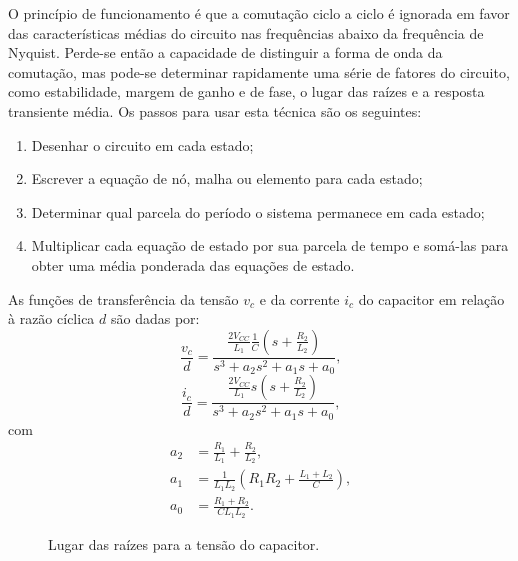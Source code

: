   O princípio de funcionamento é que a comutação ciclo a ciclo é ignorada em favor das características médias do circuito nas frequências abaixo da frequência de Nyquist. Perde-se então a capacidade de distinguir a forma de onda da comutação, mas pode-se determinar rapidamente uma série de fatores do circuito, como estabilidade, margem de ganho e de fase, o lugar das raízes e a resposta transiente média. Os passos para usar esta técnica são
  os seguintes:

  \begin{enumerate}
    \item Desenhar o circuito em cada estado;
    \item Escrever a equação de nó, malha ou elemento para cada estado;
    \item Determinar qual parcela do período o sistema permanece em cada estado;
    \item Multiplicar cada equação de estado por sua parcela de tempo e somá-las para obter uma média ponderada das equações de estado.
  \end{enumerate}

  As funções de transferência da tensão $v_c$ e da corrente $i_c$ do capacitor em relação à razão cíclica $d$ são dadas por:
  \begin{equation}
    \frac{v_c}{d} = \frac{\frac{2V_{CC}}{L_1} \frac{1}{C}
    	\left( s + \frac{R_2}{L_2} \right)}{s^3 + a_2 s^2 + a_1 s + a_0} \text{,}
    \label{eq:vc}
  \end{equation}
  \begin{equation}
    \frac{i_c}{d} = \frac{\frac{2V_{CC}}{L_1} s
    	\left( s + \frac{R_2}{L_2} \right)}{s^3 + a_2 s^2 + a_1 s + a_0} \text{,}
    \label{eq:ic}
  \end{equation}
  com
  \begin{equation}
  	\begin{split}
      a_2 & = \frac{R_1}{L_1} + \frac{R_2}{L_2} \text{,} \\
      a_1 & = \frac{1}{L_1 L_2} \left( R_1 R_2
      	+ \frac{L_1 + L_2}{C} \right) \text{,} \\
      a_0 & = \frac{R_1 + R_2}{C L_1 L_2} \text{.}
    \end{split}
  \end{equation}

  \begin{figure}[htb]
    \centering{
      }
    \renewcommand\figurename{Fig.}
    \caption{Lugar das raízes para a tensão do capacitor.}
    \label{fig:rlocus_vc}
  \end{figure}

